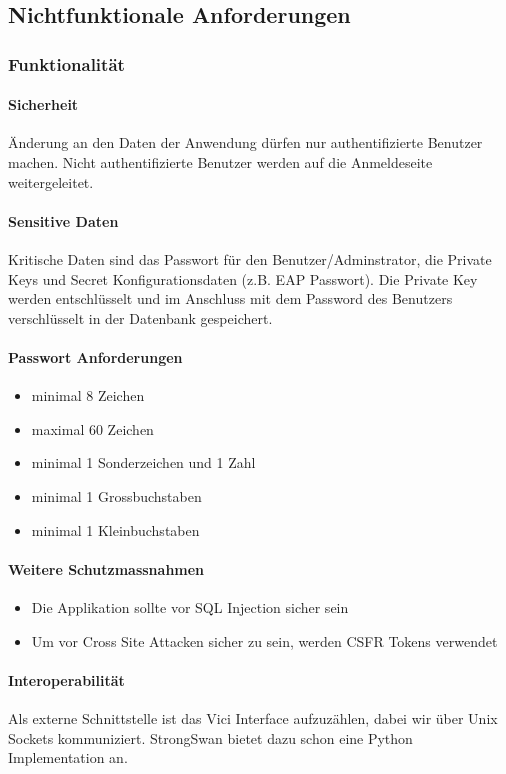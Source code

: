\subsection{Nichtfunktionale Anforderungen}
\subsubsection{Funktionalität}
\paragraph{Sicherheit}
Änderung an den Daten der Anwendung dürfen nur authentifizierte Benutzer machen. Nicht authentifizierte Benutzer werden auf die Anmeldeseite weitergeleitet.

\paragraph{Sensitive Daten}
Kritische Daten sind das Passwort für den Benutzer/Adminstrator, die Private Keys und Secret Konfigurationsdaten (z.B. EAP Passwort). Die Private Key werden entschlüsselt und im Anschluss mit dem Password des Benutzers verschlüsselt in der Datenbank gespeichert.

\paragraph{Passwort Anforderungen}
\begin{itemize}
	\item minimal 8 Zeichen
	\item maximal 60 Zeichen
	\item minimal 1 Sonderzeichen und 1 Zahl
	\item minimal 1 Grossbuchstaben
	\item minimal 1 Kleinbuchstaben
\end{itemize}

\paragraph{Weitere Schutzmassnahmen}
\begin{itemize}
	\item Die Applikation sollte vor SQL Injection sicher sein
	\item Um vor Cross Site Attacken sicher zu sein, werden CSFR Tokens verwendet
\end{itemize}

\paragraph{Interoperabilität}
Als externe Schnittstelle ist das Vici Interface aufzuzählen, dabei wir über Unix Sockets kommuniziert. StrongSwan bietet dazu schon eine Python Implementation an.
